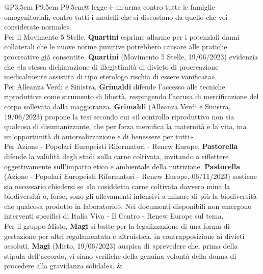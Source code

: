 \documentclass[a4paper,11pt]{article}
\begin{document}
\begin{landscape}
\begin{longtable}{@{}P{3.5cm} P{9.5cm} P{9.5cm}@{}}
legge è un'arma contro tutte le famiglie omogenitoriali, contro tutti i modelli che si discostano da quello che voi considerate normale».\\[6pt] Per il Movimento 5 Stelle, \textbf{Quartini} esprime allarme per i potenziali danni collaterali che le nuove norme punitive potrebbero causare alle pratiche procreative già consentite. \textbf{Quartini} (Movimento 5 Stelle, 19/06/2023) evidenzia che «la stessa dichiarazione di illegittimità di divieto di procreazione medicalmente assistita di tipo eterologo rischia di essere vanificata».\\[6pt] Per Alleanza Verdi e Sinistra, \textbf{Grimaldi} difende l'accesso alle tecniche riproduttive come strumento di libertà, respingendo l'accusa di mercificazione del corpo sollevata dalla maggioranza. \textbf{Grimaldi} (Alleanza Verdi e Sinistra, 19/06/2023) propone la tesi secondo cui «il controllo riproduttivo non sia qualcosa di disumanizzante, che per forza mercifica la maternità e la vita, ma un'opportunità di autorealizzazione e di benessere per tutti».\\[6pt] Per Azione - Popolari Europeisti Riformatori - Renew Europe, \textbf{Pastorella} difende la validità degli studi sulla carne coltivata, invitando a riflettere oggettivamente sull'impatto etico e ambientale della nutrizione. \textbf{Pastorella} (Azione - Popolari Europeisti Riformatori - Renew Europe, 06/11/2023) sostiene sia necessario chiedersi se «la cosiddetta carne coltivata davvero mina la biodiversità o, forse, sono gli allevamenti intensivi a minare di più la biodiversità che qualcosa prodotto in laboratorio».  Nei documenti disponibili non emergono interventi specifici di Italia Viva - Il Centro - Renew Europe sul tema.\\[6pt] Per il gruppo Misto, \textbf{Magi} si batte per la legalizzazione di una forma di gestazione per altri regolamentata e altruistica, in contrapposizione ai divieti assoluti. \textbf{Magi} (Misto, 19/06/2023) auspica di «prevedere che, prima della stipula dell'accordo, vi siano verifiche della genuina volontà della donna di procedere alla gravidanza solidale». & \\
\midrule

\end{longtable}
\end{landscape}
\end{document}
